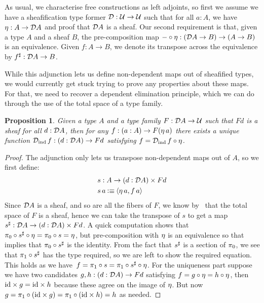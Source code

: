 \documentclass[11pt]{article}
\newtheorem{prop}[thrm]{Proposition}
\begin{document}
As usual, we characterise free constructions as left adjoints, so first we
assume we have a sheafification type former
\(\mathcal{D} : \mathcal{U} \to \mathcal{U}\) such that for all \(a : A\), we have
\(\eta : A \to \mathcal{D}{A}\) and proof that \(\mathcal{D}{A}\) is a sheaf.
%
Our second requirement is that, given a type \(A\) and a sheaf \(B\), the
pre-composition map
\(-\circ\eta : (\mathcal{D}{A} \to B) \to (A \to B)\) is an equivalence.
%
Given \(f : A \to B\), we denote its transpose across the equivalence by
\({f}^\sharp : \mathcal{D}{A} \to B\).

While this adjunction lets us define non-dependent maps out of sheafified
types, we would currently get stuck trying to prove any properties
about these maps.
%
For that, we need to recover a dependent elimination principle, which we
can do through the use of the total space of a type family.

\begin{prop}%
\label{prop:sheafification-elim-principle}
Given a type \(A\) and a type family \(F : \mathcal{D}{A} \to \mathcal{U}\) such that
\(Fd\) is a sheaf for all \(d : \mathcal{D}{A}\), then for any
\(f : (a : A) \to F(\eta\,{a})\) there exists a unique function
\(\mathcal{D}_\text{ind}\,{f} : (d : \mathcal{D}{A}) \to Fd\) satisfying
\(f = \mathcal{D}_\text{ind}\,{f} \circ \eta\).
\end{prop}
\begin{proof}
  The adjunction only lets us transpose non-dependent maps out of \(A\),
  so we first define:
  \begin{align*}
    &s : A \to {(d : \mathcal{D}{A})}\times{Fd}\\
    &s\,a \mathbin{\vcentcolon\equiv} \langle{\eta\,{a}},{f\,a}\rangle
  \end{align*}
  Since \(\mathcal{D}{A}\) is a sheaf, and so are all the fibers of \(F\), we know
  by~ that the total space of \(F\) is a sheaf,
  hence we can take the transpose of \(s\) to get a map
  \({s}^\sharp : \mathcal{D}{A} \to {(d : \mathcal{D}{A})}\times{Fd}\).
  A quick computation shows that
  \(\pi_0 \circ {s}^\sharp \circ \eta = \pi_0 \circ s = \eta\),
  but pre-composition with \(\eta\) is an equivalence so that
  implies that \(\pi_0 \circ {s}^\sharp\) is the identity.
  From the fact that \({s}^\sharp\) is a section of \(\pi_0\), we see that
  \(\pi_1 \circ {s}^\sharp\) has the type required, so we are left to
  show the required equation.
  This holds as we have~\(f = \pi_1 \circ s = \pi_1 \circ {s}^\sharp \circ \eta\).
  For the uniqueness part suppose we have two candidates
  \(g,h : (d : \mathcal{D}{A}) \to Fd\) satisfying
  \(f = g\circ\eta = h\circ\eta\), then
  \({\text{id}}\times{g} = {\text{id}}\times{h}\) because these agree on
  the image of \(\eta\).
  But now
  \(g = \pi_1 \circ ({\text{id}}\times{g}) = \pi_1 \circ ({\text{id}}\times{h}) = h\) as needed.
\end{proof}
\end{document}
